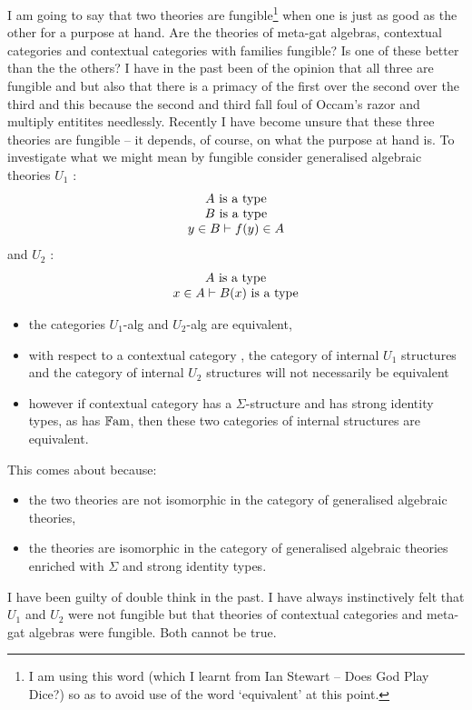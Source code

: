 

\note I am going to say that two theories are fungible\footnote{I am using this word (which I learnt from Ian Stewart -- Does God Play Dice?) so as to avoid use of the word `equivalent' at this point.} when one is just as good as the other for a purpose at hand.
\note 
Are the theories of meta-gat algebras, contextual categories and contextual categories with families fungible? Is one of these better than the the others? I have in the past been of the opinion that all three are fungible and but also that there is a primacy of the  first over the second over the third and this because the second and third fall foul of Occam's razor and multiply entitites needlessly.  Recently I have become unsure that these three theories are fungible -- it depends, of course, on what the purpose at hand is.
\note
To investigate what we might mean by fungible consider generalised algebraic theories $U_1$ :
\begin{equation*}
\label{tmorphism}
\begin{array}{c}
A\mbox{ is a type} \\
B\mbox{ is a type} \\
y \in B \vdash f(y) \in A
\end{array}
\end{equation*}
and $U_2$ :
\begin{equation*}
\label{tfamily}
\begin{array}{c}
A\mbox{ is a type} \\
x \in A \vdash B(x)\mbox{ is a type} \\
\end{array}
\end{equation*}

\begin{itemize}
\item the categories $U_1$-alg and $U_2$-alg  are equivalent,
\item 
 with respect to a contextual category \catcw, the category of internal $U_1$ structures and the category of internal  $U_2$ structures will not necessarily be equivalent 
\item however if contextual category  
\catcw has a $\Sigma$-structure and has strong identity types, as has $\mathbb{F\mathrm{am}} $, then these two categories of internal structures
are equivalent.
\end{itemize}  

This comes about because:
\begin{itemize}
\item  the two theories are not isomorphic in the category of generalised algebraic theories, 
\item  the theories are isomorphic in the category of  generalised algebraic theories enriched with $\Sigma$ 
and strong identity types.
\end{itemize}
\note I have been guilty of double think in the past. I have always instinctively felt that $U_1$ and
$U_2$ were not fungible but that theories of contextual categories and meta-gat algebras were fungible.
Both cannot be true.

